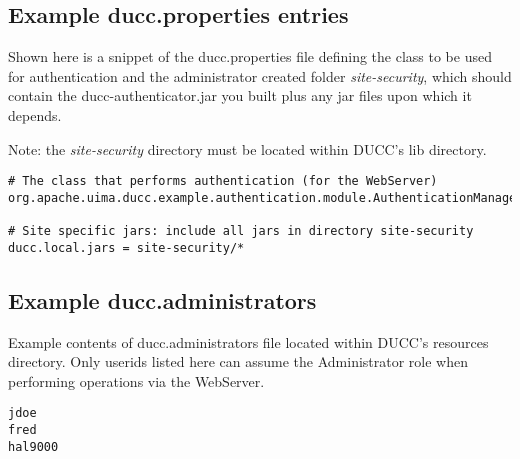 \subsection{Example ducc.properties entries}
    \begin{description}
    
    Shown here is a snippet of the ducc.properties file defining the class to be
    used for authentication and the administrator created folder
    {\em site-security}, which should contain the ducc-authenticator.jar you
    built plus any jar files upon which it depends.
    
    Note: the {\em site-security} directory must be located within DUCC's lib
    directory.
    
    \begin{verbatim}
# The class that performs authentication (for the WebServer)
org.apache.uima.ducc.example.authentication.module.AuthenticationManager

# Site specific jars: include all jars in directory site-security
ducc.local.jars = site-security/*
    \end{verbatim}
    \end{description}   
    
\subsection{Example ducc.administrators}
    \begin{description}
    
    Example contents of ducc.administrators file located within DUCC's resources
    directory. Only userids listed here can assume the Administrator role when 
    performing operations via the WebServer.
    
    \begin{verbatim}
jdoe
fred
hal9000
    \end{verbatim}
    \end{description}         